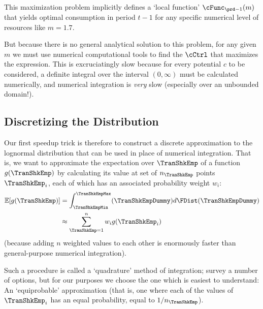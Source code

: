 \documentclass[titlepage, headings=optiontotocandhead]{Resources/texmf-local/tex/latex/econtex}
\begin{document}
\lstset{basicstyle=\ttfamily\footnotesize,breaklines=true,language=Python,frame=single}


This maximization problem implicitly defines a `local function' $\cFunc_{\prd-1}(m)$ that yields optimal consumption in period $t-1$ for any specific numerical level of resources like $m=1.7$.%

But because there is no general analytical solution to this problem, for any given $m$ we must use numerical computational tools to find the $\cCtrl$ that maximizes the expression.  This is excruciatingly slow because for every potential $c$ to be considered, a definite integral over the interval $(0,\infty)$ must be calculated numerically, and numerical integration is \textit{very} slow (especially over an unbounded domain!).

\hypertarget{discretizing-the-distribution}{}
\subsection{Discretizing the Distribution}
Our first speedup trick is therefore to construct a discrete approximation to the lognormal distribution that can be used in place of numerical integration.  That is, we want to approximate the expectation over $\TranShkEmp$ of a function $g(\TranShkEmp)$ by calculating its value at set of $n_{\TranShkEmp}$ points $\TranShkEmp_{i}$, each of which has an associated probability weight $w_{i}$:
\begin{equation*}\begin{gathered}\begin{aligned}
      \Ex[g(\TranShkEmp)] & = \int_{\TranShkEmpMin}^{\TranShkEmpMax}(\TranShkEmpDummy)d\FDist(\TranShkEmpDummy) \\
      & \approx \sum_{\TranShkEmp = 1}^{n}w_{i}g(\TranShkEmp_{i})
    \end{aligned}\end{gathered}\end{equation*}
(because adding $n$ weighted values to each other is enormously faster than general-purpose numerical integration).

Such a procedure is called a `quadrature' method of integration; \cite{Tanaka2013-bc} survey a number of options, but for our purposes we choose the one which is easiest to understand: An `equiprobable' approximation (that is, one where each of the values of $\TranShkEmp_{i}$ has an equal probability, equal to $1/n_{\TranShkEmp}$).
\end{document}
